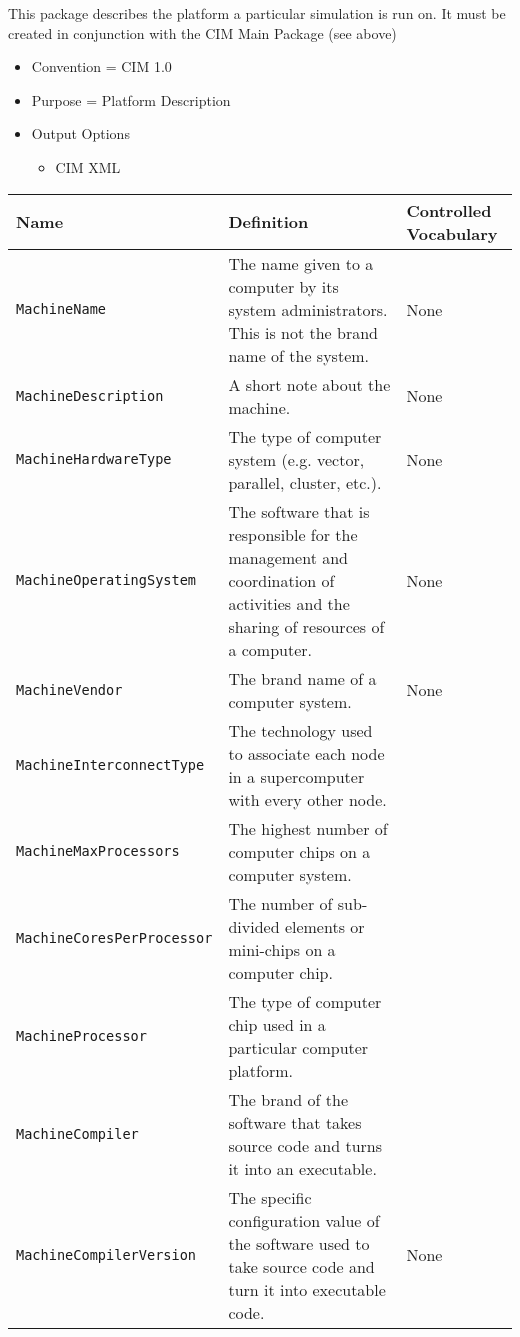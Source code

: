 This package describes the platform a particular simulation is run on. It must be created in conjunction with the CIM Main Package (see above)

\begin{itemize}
    \item Convention = CIM 1.0
    \item Purpose = Platform Description
    \item Output Options
    \begin{itemize}
       \item CIM XML 
    \end{itemize}  
\end{itemize}


\begin{tabular}{|p{8cm}|p{20cm}|p{10cm}|}
     {\bf Name} & {\bf Definition} & {\bf Controlled Vocabulary} \\
     \hline\hline
     {\tt MachineName} & The name given to a computer by its system administrators. This is not the brand name of the system.& None \\
     {\tt MachineDescription} & A short note about the machine. & None \\
     {\tt MachineHardwareType} & The type of computer system (e.g. vector, parallel, cluster, etc.).& None \\
     {\tt MachineOperatingSystem} & The software that is responsible for the management and coordination of activities and the sharing of resources of a computer. & None\\
     {\tt MachineVendor} & The brand name of a computer system. & None \\
     {\tt MachineInterconnectType} & The technology used to associate each node in a supercomputer with every other node. & \\
     {\tt MachineMaxProcessors} & The highest number of computer chips on a computer system. & \\
     {\tt MachineCoresPerProcessor} & The number of sub-divided elements or mini-chips on a computer chip. &  \\
     {\tt MachineProcessor} & The type of computer chip used in a particular computer platform. & \\
     {\tt MachineCompiler} & The brand of the software that takes source code and turns it into an executable.& \\
     {\tt MachineCompilerVersion} & The specific configuration value of the software used to take source code and turn it into executable code. & None \\
\end{tabular}


